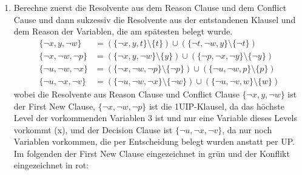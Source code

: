 \documentclass[a4paper,10pt]{article}
\begin{document}
\begin{enumerate}
\item Berechne zuerst die Resolvente aus dem Reason Clause und dem Conflict Cause und dann sukzessiv die Resolvente aus der entstandenen Klausel und dem Reason der Variablen, die am spätesten belegt wurde. 
\begin{align*}
\{\neg x, y, \neg w\} & = (\{\neg x, y, t\} \setminus \{t\}) \cup (\{\neg t, \neg w, y\} \setminus \{\neg t\}) \\
\{\neg x, \neg w, \neg p\} & = (\{\neg x, y, \neg w\} \setminus \{y\}) \cup (\{\neg p, \neg x, \neg y\} \setminus \{\neg y\}) \\
\{\neg u, \neg w, \neg x\} & = (\{\neg x, \neg w, \neg p\} \setminus \{\neg p\}) \cup (\{\neg u, \neg w, p\} \setminus \{p\}) \\
\{\neg u, \neg x, \neg v\} & = (\{\neg u, \neg w, \neg x\} \setminus \{\neg w\}) \cup (\{\neg u, \neg v, w\} \setminus \{w\}) 
\end{align*}
wobei die Resolvente aus Reason Clause und Conflict Clause $\{\neg x, y, \neg w\}$ ist der First New Clause, $\{\neg x, \neg w, \neg p\}$ ist die 1UIP-Klausel, da das höchste Level der vorkommenden Variablen 3 ist und nur eine Variable dieses Levels vorkommt (x), und der Decision Clause ist $\{\neg u, \neg x, \neg v\}$, da nur noch Variablen vorkommen, die per Entscheidung belegt wurden anstatt per UP. Im folgenden der First New Clause eingezeichnet in grün und der Konflikt eingezeichnet in rot:
\begin{center}
\end{center}
\end{enumerate}
\end{document}
